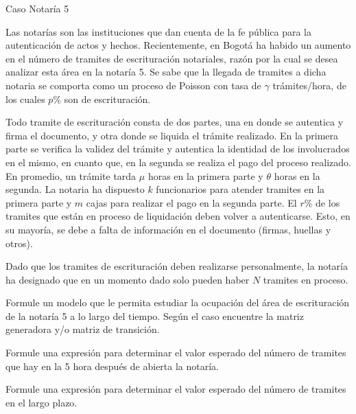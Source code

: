 \documentclass[aspectratio=1610, 10pt]{beamer}
\begin{document}
\begin{frame}[t]{Caso Notaría 5}
\footnotesize
\justifying

Las notarías son las instituciones que dan cuenta de la fe pública para la autenticación de actos y hechos. Recientemente, en Bogotá ha habido un aumento en el número de tramites de escrituración notariales, razón por la cual se desea analizar esta área en la notaría 5. Se sabe que la llegada de tramites a dicha notaria se comporta como un proceso de Poisson con tasa de $\gamma$ trámites/hora, de los cuales $p\%$ son de escrituración.

\vspace{0.3em}

Todo tramite de escrituración consta de dos partes, una en donde se autentica y firma el documento, y otra donde se liquida el trámite realizado. En la primera parte se verifica la validez del trámite y autentica la identidad de los involucrados en el mismo, en cuanto que, en la segunda se realiza el pago del proceso realizado. En promedio, un trámite tarda $\mu$ horas en la primera parte y $\theta$ horas en la segunda. La notaria ha dispuesto $k$ funcionarios para atender tramites en la primera parte y $m$ cajas para realizar el pago en la segunda parte. El $r\%$ de los tramites que están en proceso de liquidación deben volver a autenticarse. Esto, en su mayoría, se debe a falta de información en el documento (firmas, huellas y otros).

\vspace{0.3em}

Dado que los tramites de escrituración deben realizarse personalmente, la notaría ha designado que en un momento dado solo pueden haber $N$ tramites en proceso.

\vspace{0.3em}

Formule un modelo que le permita estudiar la ocupación del área de escrituración de la notaría 5 a lo largo del tiempo. Según el caso encuentre la matriz generadora y/o matriz de transición.

\vspace{0.3em}

Formule una expresión para determinar el valor esperado del número de tramites que hay en la 5 hora después de abierta la notaría.

\vspace{0.3em}

Formule una expresión para determinar el valor esperado del número de tramites en el largo plazo.

\end{frame}
\end{document}
